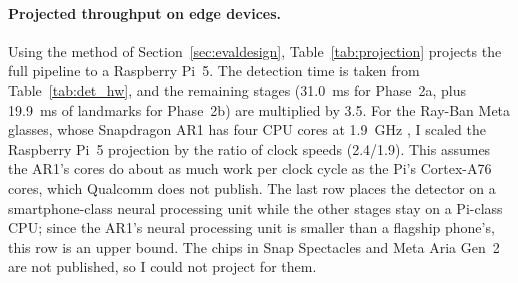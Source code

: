 \begin{table}[htbp]
\begin{singlespace}
\centering
\caption{Time to detect faces in one $640 \times 640$ frame with a nano-sized YOLO model on
different processors. The laptop figure is my measurement; the others are published
benchmarks.}
\label{tab:det_hw}
\renewcommand{\arraystretch}{1.3}
\end{singlespace}
\end{table}

\paragraph{Projected throughput on edge devices.}
Using the method of Section~\ref{sec:evaldesign}, Table~\ref{tab:projection} projects the
full pipeline to a Raspberry Pi~5. The detection time is taken from
Table~\ref{tab:det_hw}, and the remaining stages (31.0~ms for Phase~2a, plus 19.9~ms of
landmarks for Phase~2b) are multiplied by 3.5. For the Ray-Ban Meta glasses, whose
Snapdragon AR1 has four CPU cores at 1.9~GHz \cite{qcom_ar1}, I scaled the Raspberry Pi~5
projection by the ratio of clock speeds (2.4/1.9). This assumes the AR1's cores do about
as much work per clock cycle as the Pi's Cortex-A76 cores, which Qualcomm does not
publish. The last row places the detector on a smartphone-class neural processing unit
while the other stages stay on a Pi-class CPU; since the AR1's neural processing unit is
smaller than a flagship phone's, this row is an upper bound. The chips in Snap Spectacles
and Meta Aria Gen~2 are not published, so I could not project for them.

